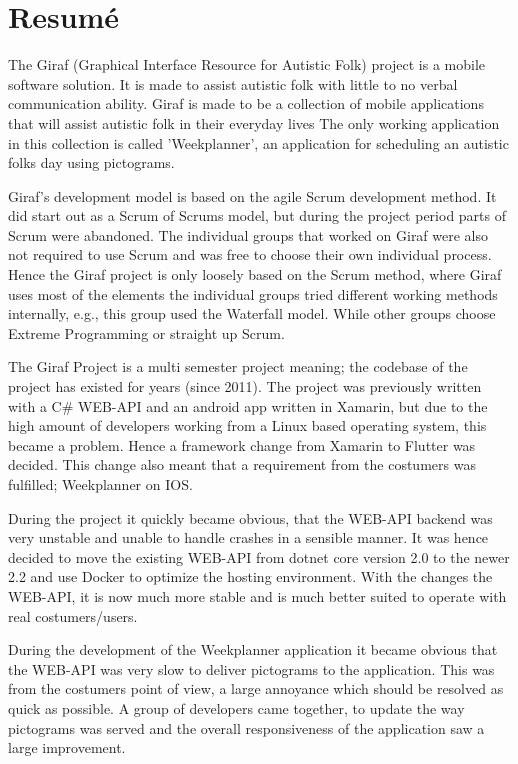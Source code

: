 \chapter*{Resumé}
The Giraf (Graphical Interface Resource for Autistic Folk) project is a mobile software solution.
It is made to assist autistic folk with little to no verbal communication ability.
Giraf is made to be a collection of mobile applications that will assist autistic folk in their everyday lives
The only working application in this collection is called 'Weekplanner', an application for scheduling an autistic folks day using pictograms.

Giraf's development model is based on the agile Scrum development method.
It did start out as a Scrum of Scrums model, but during the project period parts of Scrum were abandoned.
The individual groups that worked on Giraf were also not required to use Scrum and was free to choose their own individual process.
Hence the Giraf project is only loosely based on the Scrum method, where Giraf uses most of the elements the individual groups tried different working methods internally, e.g., this group used the Waterfall model.
While other groups choose Extreme Programming or straight up Scrum. 

The Giraf Project is a multi semester project meaning; the codebase of the project has existed for years (since 2011). 
The project was previously written with a C\# WEB-API and an android app written in Xamarin, but due to the high amount of developers working from a Linux based operating system, this became a problem. 
Hence a framework change from Xamarin to Flutter was decided. 
This change also meant that a requirement from the costumers was fulfilled; Weekplanner on IOS.

During the project it quickly became obvious, that the WEB-API backend was very unstable and unable to handle crashes in a sensible manner. 
It was hence decided to move the existing WEB-API from dotnet core version 2.0 to the newer 2.2 and use Docker to optimize the hosting environment. 
With the changes the WEB-API, it is now much more stable and is much better suited to operate with real costumers/users.

During the development of the Weekplanner application it became obvious that the WEB-API was very slow to deliver pictograms to the application. 
This was from the costumers point of view, a large annoyance which should be resolved as quick as possible. 
A group of developers came together, to update the way pictograms was served and the overall responsiveness of the application saw a large improvement.

